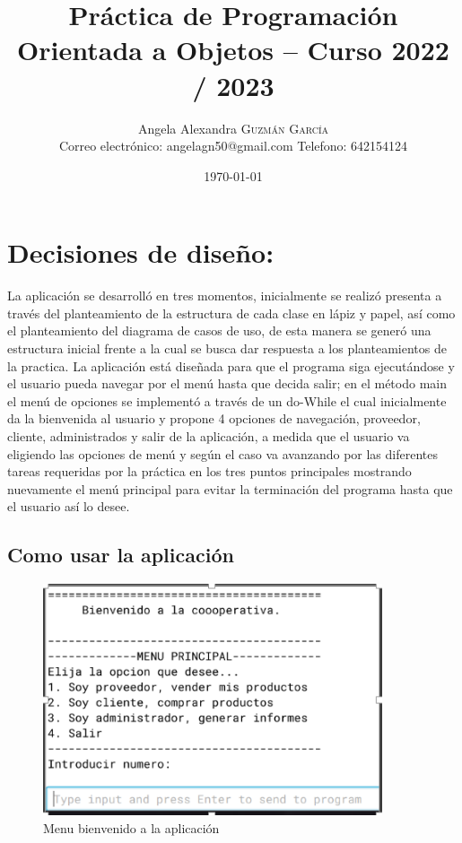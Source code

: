 \documentclass[10pt,a4paper]{article}
\title{Práctica de Programación Orientada a Objetos – Curso 2022 / 2023
} %
\author{Angela Alexandra \textsc{Guzmán García} \\ \vspace{0.5em} \normalsize Correo electrónico: angelagn50@gmail.com
\vspace{0.5em} \normalsize Telefono: 642154124} %
\date{\today} %
\begin{document}
\renewcommand{\listtablename}{Índice de tablas}
\renewcommand{\tablename}{Tabla}
\renewcommand{\lstlistingname}{Consola}

\maketitle %


\section{Decisiones de diseño:
}

La aplicación se desarrolló en tres momentos, inicialmente se realizó presenta a  través del planteamiento de la estructura de cada clase en lápiz y papel, así como  el  planteamiento del diagrama de casos de uso, de esta manera se generó una estructura inicial frente a la cual se busca dar respuesta a los planteamientos de la practica.
La aplicación está diseñada para que el programa siga ejecutándose y el usuario pueda navegar por el menú hasta que decida salir; en el método main el menú de opciones se implementó a través de un do-While el cual inicialmente da la bienvenida al usuario y propone 4 opciones de navegación, proveedor, cliente, administrados y salir de la aplicación, a medida que el usuario va eligiendo las opciones de menú y según el caso va avanzando por las diferentes tareas requeridas por la práctica en los tres puntos principales mostrando nuevamente el menú principal para evitar la terminación del programa hasta que el usuario así lo desee.

\subsection{Como usar la aplicación}



\begin{figure}[H]
  \centerline{
  \includegraphics[width=10cm]{bienvenida.png}
  }
  \captionsetup{justification=centering}
  \caption{Menu bienvenido a la aplicación \label{fig:bienvenida} }
\end{figure}
\end{document}
